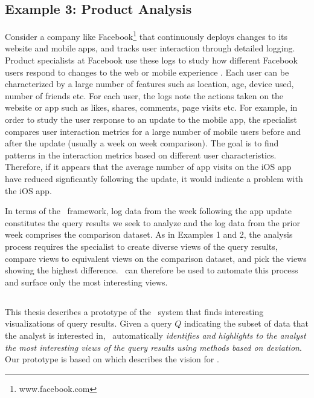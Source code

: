 \subsection{Example 3: Product Analysis}

Consider a company like Facebook\footnote{www.facebook.com} that continuously
deploys changes to its website and mobile apps, and tracks user interaction
through detailed logging. Product specialists at Facebook use these logs to
study how different Facebook users respond to changes to the web or mobile
experience \cite{DBLP:conf/vldb/AbrahamABB13}. Each user can be characterized by a large number
of features such as location, age, device used, number of friends etc.
For each user, the logs note the actions taken on the website or app such
as likes, shares, comments, page visits etc. For example, in order to study
the user response to an update to the mobile app, the specialist compares user
interaction metrics for a large number of mobile users before and after the
update (usually a week on week comparison). The goal is to find patterns in the
interaction metrics based on different user characteristics. Therefore, if it
appears that the average number of app visits on the iOS app have reduced
signficantly following the update, it would indicate a problem with the iOS app.

In terms of the \SeeDB\ framework, log data from the week following the app
update constitutes the query results we seek to analyze and the log data from
the prior week comprises the comparison dataset. As in Examples 1 and 2, the
analysis process requires the specialist to create diverse views of the query
results, compare views to equivalent views on the comparison dataset, and
pick the views showing the highest difference. 
\SeeDB\ can therefore be used to automate this process and surface only the most
interesting views.

\subsection{\SeeDB}
This thesis describes a prototype of the \SeeDB\ system that finds interesting
visualizations of query results. 
Given a query $Q$ indicating the subset of data that the analyst is interested in, \SeeDB\ automatically {\em identifies and highlights to the
analyst the most interesting views of the query results using methods based on
deviation}. 
Our prototype is based on
\cite{DBLP:conf/vldb/Parameswaran2013} which describes the vision for \SeeDB.

